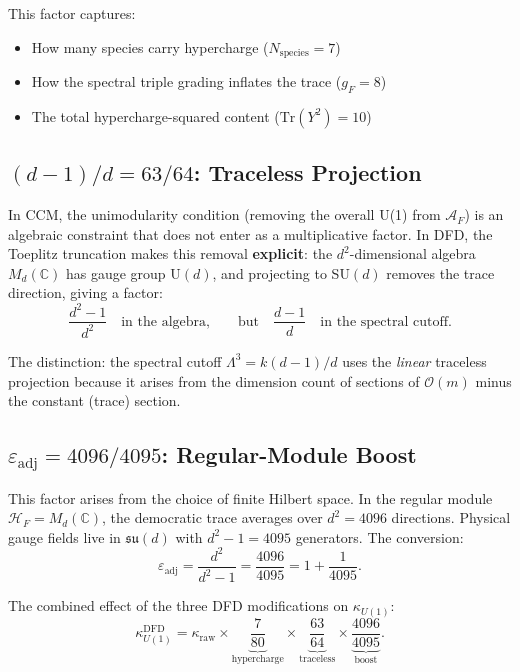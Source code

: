\documentclass[12pt,a4paper]{article}
\begin{document}
This factor captures:
\begin{itemize}[nosep]
\item How many species carry hypercharge ($N_{\mathrm{species}} = 7$)
\item How the spectral triple grading inflates the trace ($g_F = 8$)
\item The total hypercharge-squared content ($\mathrm{Tr}(Y^2) = 10$)
\end{itemize}

\subsection{$(d-1)/d = 63/64$: Traceless Projection}

In CCM, the unimodularity condition (removing the overall U(1) from
$\mathcal{A}_F$) is an algebraic constraint that does not enter as a
multiplicative factor.  In DFD, the Toeplitz truncation makes this removal
\textbf{explicit}: the $d^2$-dimensional algebra $M_d(\mathbb{C})$ has
gauge group U$(d)$, and projecting to SU$(d)$ removes the trace direction,
giving a factor:
\begin{equation}
\frac{d^2 - 1}{d^2} \quad\text{in the algebra,}\qquad
\text{but}\quad \frac{d-1}{d} \quad\text{in the spectral cutoff.}
\end{equation}

The distinction: the spectral cutoff $\Lambda^3 = k(d-1)/d$ uses the
\emph{linear} traceless projection because it arises from the dimension
count of sections of $\mathcal{O}(m)$ minus the constant (trace) section.

\subsection{$\varepsilon_{\mathrm{adj}} = 4096/4095$: Regular-Module Boost}

This factor arises from the choice of finite Hilbert space.  In the regular
module $\mathcal{H}_F = M_d(\mathbb{C})$, the democratic trace averages
over $d^2 = 4096$ directions.  Physical gauge fields live in
$\mathfrak{su}(d)$ with $d^2 - 1 = 4095$ generators.  The conversion:
\begin{equation}
\varepsilon_{\mathrm{adj}} = \frac{d^2}{d^2 - 1}
= \frac{4096}{4095} = 1 + \frac{1}{4095}.
\end{equation}

The combined effect of the three DFD modifications on $\kappa_{U(1)}$:
\begin{equation}
\kappa_{U(1)}^{\mathrm{DFD}} = \kappa_{\mathrm{raw}}
\times \underbrace{\frac{7}{80}}_{\text{hypercharge}}
\times \underbrace{\frac{63}{64}}_{\text{traceless}}
\times \underbrace{\frac{4096}{4095}}_{\text{boost}}.
\end{equation}
\end{document}
